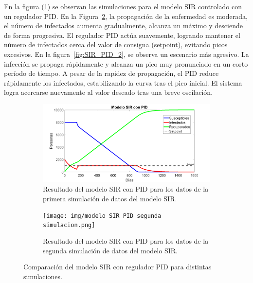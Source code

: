 En la figura (\ref{fig:simulacion1_SIRPID}) se observan las simulaciones para el modelo SIR controlado con un regulador PID.
En la Figura~\ref{fig:simulacion2_SIRPID}, la propagación de la enfermedad es moderada, el número de infectados aumenta gradualmente, alcanza un máximo y desciende de forma progresiva. El regulador PID actúa suavemente, logrando mantener el número de infectados cerca del valor de consigna (setpoint), evitando picos excesivos.
En la figura~\ref{fig:SIR_PID_2}, se observa un escenario más agresivo. La infección se propaga rápidamente y alcanza un pico muy pronunciado en un corto período de tiempo. A pesar de la rapidez de propagación, el PID reduce rápidamente los infectados, estabilizando la curva tras el pico inicial. El sistema logra acercarse nuevamente al valor deseado tras una breve oscilación.


\begin{figure}[H]
    \centering

    \begin{subfigure}[b]{0.9\linewidth}
        \centering
        \includegraphics[width=\linewidth]{img/modelo SIR PID primera simulación.png}
        \caption{Resultado del modelo SIR con PID para los datos de la primera simulación de datos del modelo SIR.}
        \label{fig:simulacion1_SIRPID}
    \end{subfigure}

    \vspace{0.5cm}

    \begin{subfigure}[b]{0.9\linewidth}
        \centering
        \texttt{[image: img/modelo SIR PID segunda simulacion.png]}
        \caption{Resultado del modelo SIR con PID para los datos de la segunda simulación de datos del modelo SIR.}
        \label{fig:simulacion2_SIRPID}
    \end{subfigure}

    \caption{Comparación del modelo SIR con regulador PID para distintas simulaciones.}
    \label{fig:comparacion_SIRPID}
\end{figure}







